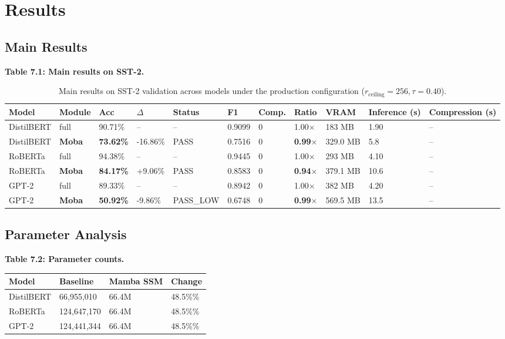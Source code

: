 \section{Results}

\subsection{Main Results}

\textbf{Table 7.1: Main results on SST-2.}

\begin{table}[t]
\centering
\small
\begin{tabular}{lllllllllll}
\toprule
\textbf{Model} & \textbf{Module} & \textbf{Acc} & \textbf{$\Delta$} & \textbf{Status} & \textbf{F1} & \textbf{Comp.} & \textbf{Ratio} & \textbf{VRAM} & \textbf{Inference (s)} & \textbf{Compression (s)} \\
\midrule
DistilBERT & full & 90.71\% & -- & -- & 0.9099 & 0 & 1.00$\times$ & 183 MB & 1.90 & -- \\
DistilBERT & \textbf{Moba} & \textbf{73.62\%} & -16.86\% & PASS & 0.7516 & 0 & \textbf{0.99$\times$} & 329.0 MB & 5.8 & -- \\
RoBERTa & full & 94.38\% & -- & -- & 0.9445 & 0 & 1.00$\times$ & 293 MB & 4.10 & -- \\
RoBERTa & \textbf{Moba} & \textbf{84.17\%} & +9.06\% & PASS & 0.8583 & 0 & \textbf{0.94$\times$} & 379.1 MB & 10.6 & -- \\
GPT-2 & full & 89.33\% & -- & -- & 0.8942 & 0 & 1.00$\times$ & 382 MB & 4.20 & -- \\
GPT-2 & \textbf{Moba} & \textbf{50.92\%} & -9.86\% & PASS_LOW & 0.6748 & 0 & \textbf{0.99$\times$} & 569.5 MB & 13.5 & -- \\
\bottomrule
\end{tabular}
\caption{Main results on SST-2 validation across models under the production configuration ($r_{\mathrm{ceiling}}=256, \tau=0.40$).}
\label{tab:main_sst2}
\end{table}

\subsection{Parameter Analysis}

\textbf{Table 7.2: Parameter counts.}

\begin{table}[H]
\centering
\small
\begin{tabular}{llll}
\toprule
\textbf{Model} & \textbf{Baseline} & \textbf{Mamba SSM} & \textbf{Change} \\
\midrule
DistilBERT & 66,955,010 & 66.4M & 48.5\%\% \\
RoBERTa & 124,647,170 & 66.4M & 48.5\%\% \\
GPT-2 & 124,441,344 & 66.4M & 48.5\%\% \\
\bottomrule
\end{tabular}
\end{table}

